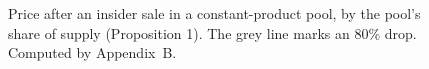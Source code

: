 \begin{figure}[t]
\caption{Price after an insider sale in a constant-product pool, by the pool's share of supply (Proposition 1). The grey line marks an 80\% drop. Computed by Appendix~B.}
\label{fig:exit}
\end{figure}
